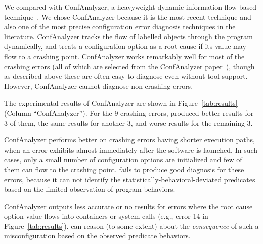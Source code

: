 We compared \ourtool with ConfAnalyzer, a heavyweight dynamic information
flow-based technique~\cite{Rabkin:2011:PPC}.
We chose ConfAnalyzer because it is the most recent technique and
also one of the most precise configuration error diagnosis techniques
in the literature.
ConfAnalyzer tracks the flow of labelled objects through the
program dynamically,
and treats a configuration option as a root cause if its
value may flow to a crashing point.
ConfAnalyzer works remarkably well for most of the crashing errors (all of
which are selected from the ConfAnalyzer paper~\cite{Rabkin:2011:PPC}), though as
described above these are often easy to diagnose even without tool
support. However, ConfAnalyzer cannot diagnose non-crashing errors.

The experimental results of ConfAnalyzer are shown in Figure~\ref{tab:results} (Column ``ConfAnalyzer'').
For the 9 crashing errors, \ourtool produced better results for 3 of them,
the same results for another 3, and worse results for the remaining 3.

ConfAnalyzer performs better on crashing errors
having shorter execution paths, when an error exhibits
almost immediately after the software is launched.
In such cases, only a small number of configuration options are initialized and
few of them can flow to the crashing point. 
\ourtool fails to produce good diagnosis for these errors, because it can not identify
 the statistically-behavioral-deviated predicates based on the limited
observation of program behaviors.

ConfAnalyzer outputs less accurate or no results
for errors where the root cause option value
flows into containers or system calls (e.g., error 14 in Figure~\ref{tab:results}).
\ourtool can reason (to some extent) about the \textit{consequence} of
such a misconfiguration based on the observed predicate behaviors.
